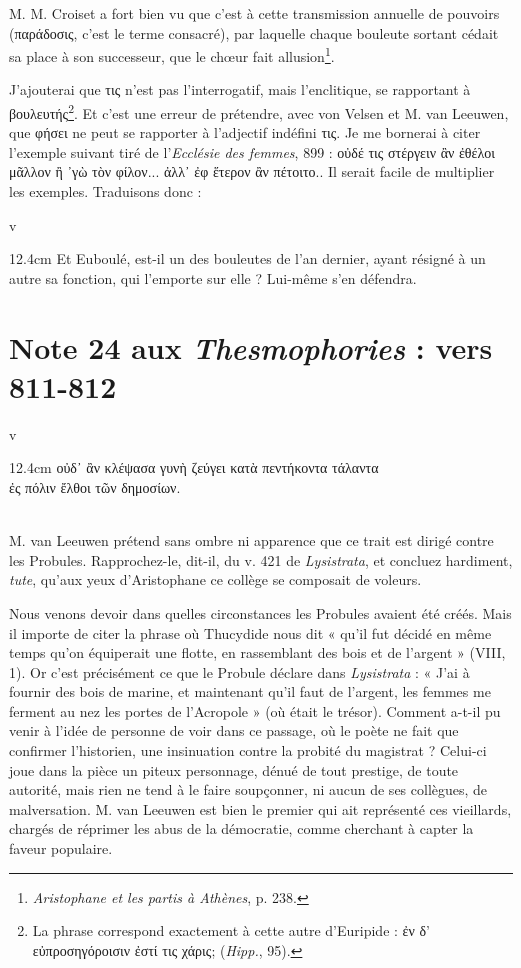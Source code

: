 \documentclass{book}%
\newcommand{\italique}[1]{\textit{#1}}%
\newcommand{\espace}[1]{\hspace{#1}}%
\newcommand{\fantome}{{\color{white}v}}
\newcommand{\Note}[1]{\section*{#1}%
\addcontentsline{toc}{section}{#1}}
\newcommand{\note}[1]{\footnote{#1}}
\newcommand{\citComm}[1]{\fantome\\
\espace{1cm}\begin{minipagewithmarginpars}{12.4cm}%
#1
\end{minipagewithmarginpars}%
}
\begin{document}
M. M. Croiset a fort bien vu que c'est à cette transmission annuelle de pouvoirs (παράδοσις, c'est le terme consacré), par laquelle chaque bouleute sortant cédait sa place à son successeur, que le chœur fait allusion\note{\italique{Aristophane et les partis à Athènes}, p. 238.}. 

J'ajouterai que τις n'est pas l'interrogatif, mais l'enclitique, se rapportant à βουλευτής\note{La phrase correspond exactement à cette autre d'Euripide : ἐν δ' εὐπροσηγόροισιν ἐστί τις χάρις; (\italique{Hipp.}, 95).}. Et c'est une erreur de prétendre, avec von Velsen et M. van Leeuwen, que φήσει ne peut se rapporter à l'adjectif indéfini τις. Je me bornerai à citer l'exemple suivant tiré de l'\italique{Ecclésie des femmes}, 899 : οὐδέ τις στέργειν ἂν ἐθέλοι μᾶλλον ἢ ᾿γὼ τὸν φίλον... ἀλλ᾽ ἐφ ἕτερον ἂν πέτοιτο.. Il serait facile de multiplier les exemples. Traduisons donc : 

\citComm{Et Euboulé, est-il un des bouleutes de l'an dernier, ayant résigné à un autre sa fonction, qui l'emporte sur elle ? Lui-même s'en défendra.}

\Note{Note 24 aux \italique{Thesmophories} : vers 811-812}

\citComm{οὐδ᾽ ἂν κλέψασα γυνὴ ζεύγει κατὰ πεντήκοντα τάλαντα\\
	ἐς πόλιν ἔλθοι τῶν δημοσίων.}\\

M. van Leeuwen prétend sans ombre ni apparence que ce trait est dirigé contre les Probules. Rapprochez-le, dit-il, du v. 421 de \italique{Lysistrata}, et concluez hardiment, \italique{tute}, qu'aux yeux d'Aristophane ce collège se composait de voleurs. 

Nous venons devoir dans quelles circonstances les Probules avaient été créés. Mais il importe de citer la phrase où Thucydide nous dit « qu'il fut décidé en même temps qu'on équiperait une flotte, en rassemblant des bois et de l'argent » (VIII, 1). 
Or c'est précisément ce que le Probule déclare dans \italique{Lysistrata} : « J'ai à fournir des bois de marine, et maintenant qu'il faut de l'argent, les femmes me ferment au nez les portes de l'Acropole » (où était le trésor). 
Comment a-t-il pu venir à l'idée de personne de voir dans ce passage, où le poète ne fait que confirmer l'historien, une insinuation contre la probité du magistrat ? Celui-ci joue dans la pièce un piteux personnage, dénué de tout prestige, de toute autorité, mais rien ne tend à le faire soupçonner, ni aucun de ses collègues, de malversation. 
M. van Leeuwen est bien le premier qui ait représenté ces vieillards, chargés de réprimer les abus de la démocratie, comme cherchant à capter la faveur populaire. 
\end{document}
